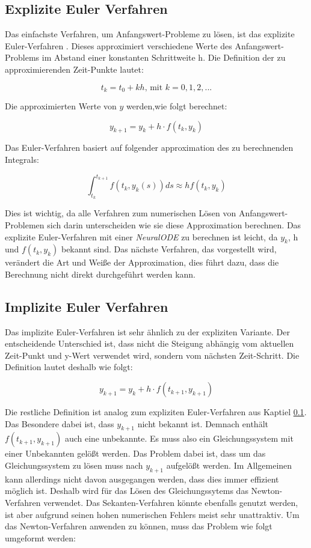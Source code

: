 \subsection{Explizite Euler Verfahren} \label{sec:explizites_euler_verfahren}


Das einfachste Verfahren, um Anfangswert-Probleme zu lösen, ist das explizite Euler-Verfahren \cite[Kapitel~II.1]{ode1}.
Dieses approximiert verschiedene Werte des Anfangswert-Problems 
im Abstand einer konstanten Schrittweite h.
Die Definition der zu approximierenden Zeit-Punkte lautet:

$$
t_k = t_0 + kh \text{, mit } k = 0, 1, 2, ...
$$

Die approximierten Werte von $y$ werden,wie folgt berechnet:

$$
y_{k + 1} = y_{k} + h \cdot f(t_k, y_k)
$$

Das Euler-Verfahren basiert auf folgender approximation des zu berechnenden Integrals:

$$
\int_{t_k}^{t_{k+1}} f(t_k, y_k(s)) ds \approx h f(t_k, y_k)
$$

Dies ist wichtig, da alle Verfahren zum numerischen Lösen von Anfangswert-Problemen sich darin unterscheiden wie sie diese Approximation berechnen.
Das explizite Euler-Verfahren mit einer \textit{NeuralODE} zu berechnen
ist leicht, da $y_k$, h und $f(t_k, y_k)$ bekannt sind.
Das nächste Verfahren, das vorgestellt wird, verändert die Art und Weiße der Approximation, dies führt dazu, dass die Berechnung nicht direkt durchgeführt werden kann.

\subsection{Implizite Euler Verfahren}

Das implizite Euler-Verfahren  \cite[Kapitel~II.7]{ode1} ist sehr ähnlich zu der expliziten Variante.
Der entscheidende Unterschied ist, dass nicht die Steigung abhängig vom aktuellen 
Zeit-Punkt und y-Wert verwendet wird, sondern vom nächsten Zeit-Schritt.
Die Definition lautet deshalb wie folgt:

$$
y_{k + 1} = y_k + h \cdot f(t_{k + 1}, y_{k + 1})
$$

Die restliche Definition ist analog zum expliziten Euler-Verfahren aus Kaptiel \ref{sec:explizites_euler_verfahren}.
Das Besondere dabei ist, dass $y_{k + 1}$ nicht bekannt ist.
Demnach enthält $f(t_{k + 1}, y_{k + 1})$ auch eine unbekannte.
Es muss also ein Gleichungssystem mit einer Unbekannten gelößt werden.
Das Problem dabei ist, dass um das Gleichungssystem zu lösen muss nach $y_{k + 1}$ aufgelößt werden.
Im Allgemeinen kann allerdings nicht davon ausgegangen werden, dass dies immer effizient möglich ist.
Deshalb wird für das Lösen des Gleichungssytems das Newton-Verfahren \cite[Kapitel~5.5]{intorduction_to_numerical_analysis} verwendet.
Das Sekanten-Verfahren könnte ebenfalls genutzt werden, ist aber aufgrund seinen hohen numerischen 
Fehlers meist sehr unattraktiv.
Um das Newton-Verfahren anwenden zu können, muss das Problem wie folgt umgeformt werden:

